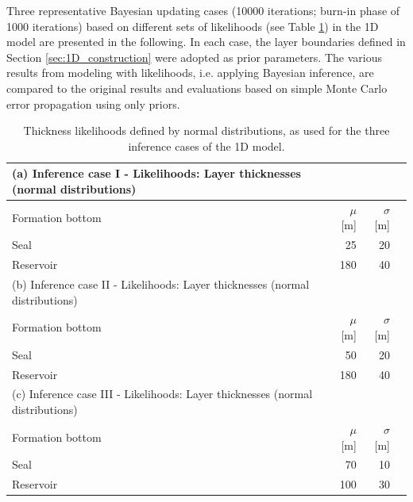			Three representative Bayesian updating cases (10000 iterations; burn-in phase of 1000 iterations) based on different sets of likelihoods (see Table \ref{tab:1D_likelihoods}) in the 1D model are presented in the following. In each case, the layer boundaries defined in Section \ref{sec:1D_construction} were adopted as prior parameters. The various results from modeling with likelihoods, i.e. applying Bayesian inference, are compared to the original results and evaluations based on simple Monte Carlo error propagation using only priors.
			\begin{table}[h]
				\centering
			\begin{tabular}{lrrr} 
				\toprule
				(a) Inference case I - Likelihoods: Layer thicknesses (normal distributions)\\  
				\midrule 
				Formation bottom & $\mu$ [m] & $\sigma$ [m]\\ 
				\midrule 
				Seal & 25 & 20 \\
				Reservoir & 180 & 40 \\
				\bottomrule
				\toprule
				(b) Inference case II - Likelihoods: Layer thicknesses (normal distributions)\\
				\midrule 
				Formation bottom & $\mu$ [m] & $\sigma$ [m]\\ 
				\midrule 
				Seal & 50 & 20 \\
				Reservoir & 180 & 40 \\
				\bottomrule
				\toprule
				(c) Inference case III - Likelihoods: Layer thicknesses (normal distributions)\\
				\midrule 
				Formation bottom & $\mu$ [m] & $\sigma$ [m]\\ 
				\midrule 
				Seal & 70 & 10 \\
				Reservoir & 100 & 30 \\
				\bottomrule
			\end{tabular}
			\caption{Thickness likelihoods defined by normal distributions, as used for the three inference cases of the 1D model.}
			\label{tab:1D_likelihoods}
			\end{table}
				
